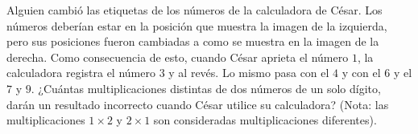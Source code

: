 Alguien cambió las etiquetas de los números de la calculadora de César. Los números deberían estar en la posición que muestra la imagen de la izquierda, pero sus posiciones fueron cambiadas a como se muestra en la imagen de la derecha. Como consecuencia de esto, cuando César aprieta el número $1$, la calculadora registra el número $3$ y al revés. Lo mismo pasa con el $4$ y con el $6$ y el $7$ y $9$. ¿Cuántas multiplicaciones distintas de dos números de un solo dígito, darán un resultado incorrecto cuando César utilice su calculadora? (Nota: las multiplicaciones $1 \times 2$ y $2 \times 1$ son consideradas multiplicaciones diferentes).